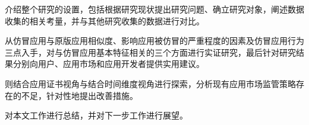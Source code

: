  介绍整个研究的设置，包括根据研究现状提出研究问题、确立研究对象，阐述数据收集的相关考量，并与其他研究收集的数据进行对比。

 从仿冒应用与原版应用相似度、影响应用被仿冒的严重程度的因素及仿冒应用行为三点入手，对与仿冒应用基本特征相关的三个方面进行实证研究，最后针对研究结果分别向用户、应用市场和应用开发者提供实用建议。

 则结合应用证书视角与结合时间维度视角进行探索，分析现有应用市场监管策略存在的不足，针对性地提出改善措施。



 对本文工作进行总结，并对下一步工作进行展望。
